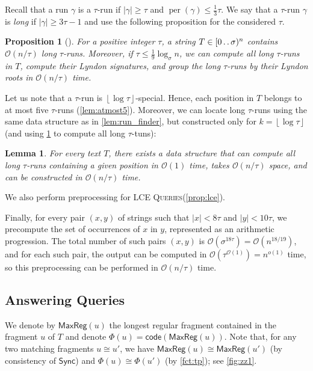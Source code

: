 \documentclass[a4paper]{article}
\newtheorem{lemma}[theorem]{Lemma}
\newtheorem{proposition}[theorem]{Proposition}
\theoremstyle{definition}
\theoremstyle{remark}
\newcommand{\LCEQ}{\textsc{LCE Queries}\xspace}
\newcommand{\floor}[1]{\left\lfloor #1 \right\rfloor}
\newcommand{\dd}{\mathinner{\ldotp\ldotp}}
\DeclareMathOperator{\per}{per}
\newcommand{\MaxReg}{\mathsf{MaxReg}}
\newcommand{\code}{\mathsf{code}}
\newcommand{\Oh}{\mathcal{O}}
\renewcommand{\S}{\mathsf{Sync}}
\renewcommand{\S}{\mathsf{Sync}}
\begin{document}
Recall that a run $\gamma$ is a $\tau$-run if $|\gamma| \ge \tau$ and $\per(\gamma) \le \frac13 \tau$.
We say that a $\tau$-run $\gamma$ is \emph{long} if $|\gamma| \ge 3\tau-1$ and use the following proposition for the considered $\tau$.

\begin{proposition}[{\cite[Section 6.1.2]{Kempa2019}}]\label{prp:taurons}
For a positive integer $\tau$, a string $T \in [0 \dd \sigma)^n$ contains $\Oh(n/\tau)$ long $\tau$-runs.
Moreover, if $\tau \le \frac19 \log_\sigma n$, we can compute all long $\tau$-runs in
$T$, compute their Lyndon signatures, and group the long $\tau$-runs by their Lyndon roots in $\Oh(n/\tau)$ time.
\end{proposition}

Let us note that a $\tau$-run is $\floor{\log\tau}$-special.
Hence, each position in $T$ belongs to at most five $\tau$-runs (\cref{lem:atmost5}).
Moreover, we can locate long $\tau$-runs using the same data structure as in \cref{lem:run_finder}, but constructed only for
$k=\floor{\log\tau}$ (and using \cref{prp:taurons} to compute all long $\tau$-tuns):
\begin{lemma}\label{lem:run_finder2}
  For every text $T$, there exists a data structure that can compute all long $\tau$-runs containing a given position in $\Oh(1)$ time,
  takes $\Oh(n/\tau)$ space, and can be constructed in $\Oh(n/\tau)$ time.
\end{lemma}

\noindent
We also perform preprocessing for \LCEQ (\cref{prop:lce}).

Finally, for every pair $(x,y)$ of strings such that $|x| < 8\tau$ and $|y| < 10\tau$, we precompute
the set of occurrences of $x$ in $y$, represented as an arithmetic progression.
The total number of such pairs $(x,y)$ is $\Oh(\sigma^{18\tau})=\Oh(n^{18/19})$, and for each such pair,
the output can be computed in $\Oh(\tau^{\Oh(1)})=n^{o(1)}$ time, so this preprocessing can be performed
in $\Oh(n/\tau)$ time.


\subsection{Answering Queries} 
We denote by $\MaxReg(u)$ the longest regular fragment 
contained in the fragment $u$ of $T$ and denote  $\Phi(u)=\code(\MaxReg(u))$.
Note that, for any two matching fragments $u\cong u'$, we have $\MaxReg(u) \cong \MaxReg(u')$ (by consistency of $\S$)
and $\Phi(u)\cong \Phi(u')$ (by \cref{fct:tp}); see \cref{fig:zz1}.
\end{document}
